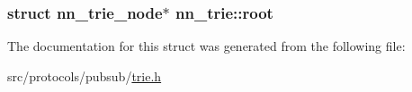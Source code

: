 \subsubsection[{root}]{\setlength{\rightskip}{0pt plus 5cm}struct {\bf nn\+\_\+trie\+\_\+node}$\ast$ nn\+\_\+trie\+::root}\hypertarget{structnn__trie_a013f0fc99bb590967abc42b70fc02b40}{}\label{structnn__trie_a013f0fc99bb590967abc42b70fc02b40}


The documentation for this struct was generated from the following file\+:\begin{DoxyCompactItemize}
\item 
src/protocols/pubsub/\hyperlink{trie_8h}{trie.\+h}\end{DoxyCompactItemize}
